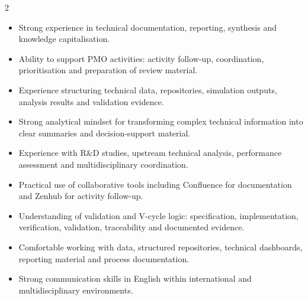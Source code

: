 \documentclass[8pt,a4paper,ragged2e,withhyper]{altacv}
\begin{document}
\begin{paracol}{2}
\begin{itemize}
  \item Strong experience in technical documentation, reporting, synthesis and knowledge capitalisation.
  \item Ability to support PMO activities: activity follow-up, coordination, prioritisation and preparation of review material.
  \item Experience structuring technical data, repositories, simulation outputs, analysis results and validation evidence.
  \item Strong analytical mindset for transforming complex technical information into clear summaries and decision-support material.
  \item Experience with R\&D studies, upstream technical analysis, performance assessment and multidisciplinary coordination.
  \item Practical use of collaborative tools including Confluence for documentation and Zenhub for activity follow-up.
  \item Understanding of validation and V-cycle logic: specification, implementation, verification, validation, traceability and documented evidence.
  \item Comfortable working with data, structured repositories, technical dashboards, reporting material and process documentation.
  \item Strong communication skills in English within international and multidisciplinary environments.
\end{itemize}


\divider
{}
\divider

\medskip



\divider


\divider


\divider




\end{paracol}
\end{document}
